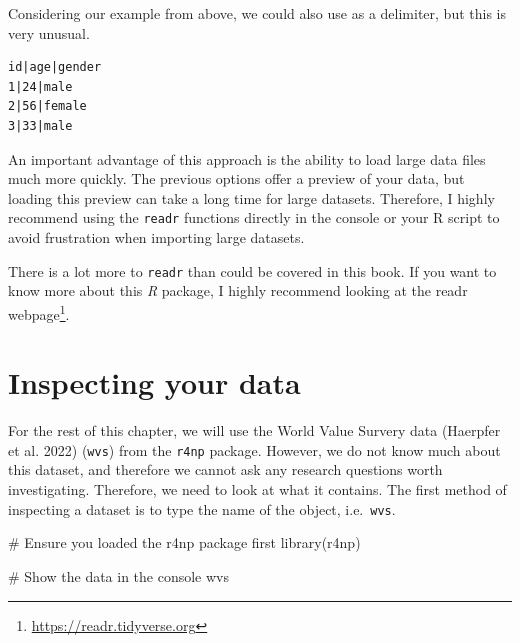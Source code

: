 \documentclass[
  letterpaper,
]{krantz}
\makeatletter
\newenvironment{Shaded}{\begin{snugshade}}{\end{snugshade}}
\newcommand{\CommentTok}[1]{\textcolor[rgb]{0.37,0.37,0.37}{#1}}
\newcommand{\FunctionTok}[1]{\textcolor[rgb]{0.28,0.35,0.67}{#1}}
\newcommand{\NormalTok}[1]{\textcolor[rgb]{0.00,0.23,0.31}{#1}}
\renewcommand{\href}[2]{#2\footnote{\url{#1}}}
\newenvironment{kframe}{%
\medskip{}
\setlength{\fboxsep}{.8em}
 \def\at@end@of@kframe{}%
 \ifinner\ifhmode%
  \def\at@end@of@kframe{\end{minipage}}%
  \begin{minipage}{\columnwidth}%
 \fi\fi%
 \def\FrameCommand##1{\hskip\@totalleftmargin \hskip-\fboxsep
 \colorbox{shadecolor}{##1}\hskip-\fboxsep
     \hskip-\linewidth \hskip-\@totalleftmargin \hskip\columnwidth}%
 \MakeFramed {\advance\hsize-\width
   \@totalleftmargin\z@ \linewidth\hsize
   \@setminipage}}%
 {\par\unskip\endMakeFramed%
 \at@end@of@kframe}
\renewenvironment{Shaded}{\begin{kframe}}{\end{kframe}}
\makeatother
\begin{document}
Considering our example from above, we could also use
\texttt{\textbar{}} as a delimiter, but this is very unusual.

\begin{verbatim}
id|age|gender
1|24|male
2|56|female
3|33|male
\end{verbatim}

An important advantage of this approach is the ability to load large
data files much more quickly. The previous options offer a preview of
your data, but loading this preview can take a long time for large
datasets. Therefore, I highly recommend using the \texttt{readr}
functions directly in the console or your R script to avoid frustration
when importing large datasets.

There is a lot more to \texttt{readr} than could be covered in this
book. If you want to know more about this \emph{R} package, I highly
recommend looking at the \href{https://readr.tidyverse.org}{readr
webpage}.

\section{Inspecting your data}\label{sec-inspecting-raw-data}

For the rest of this chapter, we will use the World Value Survery data
(Haerpfer et al. 2022) (\texttt{wvs}) from the \texttt{r4np} package.
However, we do not know much about this dataset, and therefore we cannot
ask any research questions worth investigating. Therefore, we need to
look at what it contains. The first method of inspecting a dataset is to
type the name of the object, i.e.~\texttt{wvs}.

\begin{Shaded}
\begin{Highlighting}[]
\CommentTok{\# Ensure you loaded the \textquotesingle{}r4np\textquotesingle{} package first}
\FunctionTok{library}\NormalTok{(r4np)}

\CommentTok{\# Show the data in the console}
\NormalTok{wvs}
\end{Highlighting}
\end{Shaded}
\end{document}
